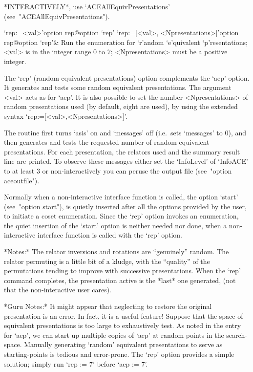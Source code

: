 *INTERACTIVELY*,            use             `ACEAllEquivPresentations'
(see~"ACEAllEquivPresentations").

\>`rep:=<val>'{option rep}@{option `rep'}
\>`rep:=[<val>, <Npresentations>]'{option rep}@{option `rep'}&
Run the enumeration for `r'andom `e'quivalent `p'resentations;
<val> is in the integer range 0 to 7;
<Npresentations> must be a positive integer.

The `rep' (random equivalent  presentations)  option  complements  the
`aep'  option.  It  generates  and  tests   some   random   equivalent
presentations. The argument <val>  acts  as  for  `aep'.  It  is  also
possible to set the number <Npresentations>  of  random  presentations
used (by default, eight  are  used),  by  using  the  extended  syntax
`rep:=[<val>,<Npresentations>]'.

The routine first  turns  `asis'  on  and  `messages'  off  (i.e.~sets
`messages' to 0), and then generates and tests the requested number of
random equivalent presentations. For each presentation,  the  relators
used and the  summary  result  line  are  printed.  To  observe  these
messages either set the `InfoLevel' of `InfoACE'  to  at  least  3  or
non-interactively you can peruse the {\ACE} output  file  (see~"option
aceoutfile").

Normally when a non-interactive {\ACE} interface function  is  called,
the option `start' (see~"option start"), is quietly inserted after all
the options provided by the user, to  initiate  a  coset  enumeration.
Since the `rep' option invokes an enumeration, the quiet insertion  of
the `start' option is neither needed nor done, when a  non-interactive
{\ACE} interface function is called with the `rep' option.

*Notes:*
The relator inversions and rotations  are  ``genuinely''  random.  The
relator permuting is a little bit of a kludge, with the ``quality'' of
the permutations tending to  improve  with  successive  presentations.
When the `rep' command  completes,  the  presentation  active  is  the
*last* one generated, (not that the non-interactive user cares).

*Guru Notes:*
It might appear that neglecting to restore the  original  presentation
is an error. In fact, it is a useful feature! Suppose that  the  space
of equivalent presentations is too  large  to  exhaustively  test.  As
noted in the entry for `aep', we can start up multiple copies of `aep'
at random points in the  search-space.  Manually  generating  `random'
equivalent presentations to serve as starting-points  is  tedious  and
error-prone. The `rep' option provides a simple solution;  simply  run
`rep := 7' before `aep := 7'.

